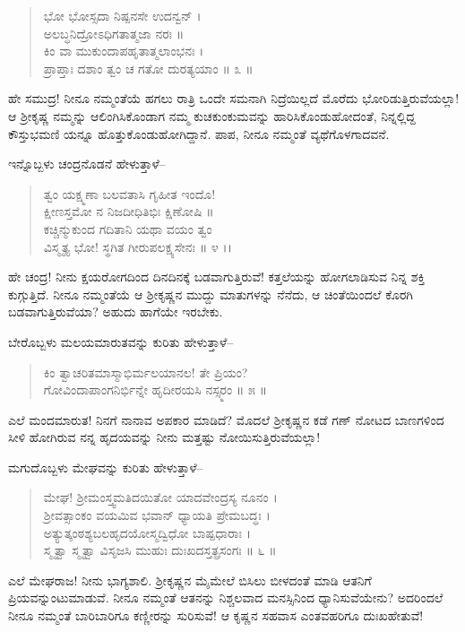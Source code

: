 \begin{verse}
ಭೋ ಭೋಸ್ಸದಾ ನಿಷ್ಪನಸೇ ಉದನ್ವನ್ ।\\ಅಲಬ್ಧನಿದ್ರೋಽಧಿಗತಾತ್ಮಜಾ ನರಃ ॥\\ಕಿಂ ವಾ ಮುಕುಂದಾಪಹೃತಾತ್ಮಲಾಂಭನಃ ।\\ಪ್ರಾಪ್ತಾಃ ದಶಾಂ ತ್ವಂ ಚ ಗತೋ ದುರತ್ಯಯಾಂ \num{॥ ೩ ॥}
\end{verse}

ಹೇ ಸಮುದ್ರ! ನೀನೂ ನಮ್ಮಂತೆಯೆ ಹಗಲು ರಾತ್ರಿ ಒಂದೇ ಸಮನಾಗಿ ನಿದ್ರೆಯಿಲ್ಲದೆ ಮೊರೆದು ಭೋರಿಡುತ್ತಿರುವೆಯಲ್ಲಾ! ಆ ಶ್ರೀಕೃಷ್ಣ ನಮ್ಮನ್ನು ಆಲಿಂಗಿಸಿಕೊಂಡಾಗ ನಮ್ಮ ಕುಚಕುಂಕುಮವನ್ನು ಹಾರಿಸಿಕೊಂಡುಹೋದಂತೆ, ನಿನ್ನಲ್ಲಿದ್ದ ಕೌಸ್ತುಭಮಣಿ ಯನ್ನೂ ಹೊತ್ತುಕೊಂಡುಹೋಗಿದ್ದಾನೆ. ಪಾಪ, ನೀನೂ ನಮ್ಮಂತೆ ವ್ಯಥೆಗೊಳಗಾದವನೆ.

ಇನ್ನೊಬ್ಬಳು ಚಂದ್ರನೊಡನೆ ಹೇಳುತ್ತಾಳೆ–

\begin{verse}
ತ್ವಂ ಯಕ್ಷ್ಮಣಾ ಬಲವತಾಸಿ ಗೃಹೀತ ಇಂದೊ!\\ಕ್ಷೀಣಸ್ತಮೋ ನ ನಿಜದೀಧಿತಿಭಿಃ ಕ್ಷಿಣೋಷಿ ॥\\ಕಚ್ಚಿನ್ಮುಕುಂದ ಗದಿತಾನಿ ಯಥಾ ವಯಂ ತ್ವಂ \\ವಿಸ್ಮೃತ್ಯ ಭೋ! ಸ್ಥಗಿತ ಗೀರುಪಲಕ್ಷ್ಯಸೇನಃ \num{॥ ೪ ।।}
\end{verse}

ಹೇ ಚಂದ್ರ! ನೀನು ಕ್ಷಯರೋಗದಿಂದ ದಿನದಿನಕ್ಕೆ ಬಡವಾಗುತ್ತಿರುವೆ! ಕತ್ತಲೆಯನ್ನು ಹೋಗಲಾಡಿಸುವ ನಿನ್ನ ಶಕ್ತಿ ಕುಗ್ಗುತ್ತಿದೆ. ನೀನೂ ನಮ್ಮಂತೆಯೆ ಆ ಶ್ರೀಕೃಷ್ಣನ ಮುದ್ದು ಮಾತುಗಳನ್ನು ನೆನೆದು, ಆ ಚಿಂತೆಯಿಂದಲೆ ಕೊರಗಿ ಬಡವಾಗುತ್ತಿರುವೆಯಾ? ಅಹುದು ಹಾಗೆಯೇ ಇರಬೇಕು.

ಬೇರೊಬ್ಬಳು ಮಲಯಮಾರುತವನ್ನು ಕುರಿತು ಹೇಳುತ್ತಾಳೆ–

\begin{verse}
ಕಿಂ ತ್ವಾಚರಿತಮಾಸ್ಮಾಭಿರ್ಮಲಯಾನಲ! ತೇ ಪ್ರಿಯಂ?\\ಗೋವಿಂದಾಪಾಂಗನಿರ್ಭಿನ್ನೇ ಹೃದೀರಯಸಿ ನಸ್ಸ್ಮರಂ \num{॥ ೫ ॥}
\end{verse}

ಎಲೆ ಮಂದಮಾರುತ! ನಿನಗೆ ನಾನಾವ ಅಪಕಾರ ಮಾಡಿದೆ? ಮೊದಲೆ ಶ್ರೀಕೃಷ್ಣನ ಕಡೆ ಗಣ್ ನೋಟದ ಬಾಣಗಳಿಂದ ಸೀಳಿ ಹೋಗಿರುವ ನನ್ನ ಹೃದಯವನ್ನು ನೀನು ಮತ್ತಷ್ಟು ನೋಯಿಸುತ್ತಿರುವೆಯಲ್ಲಾ!

ಮಗುದೊಬ್ಬಳು ಮೇಘವನ್ನು ಕುರಿತು ಹೇಳುತ್ತಾಳೆ–

\begin{verse}
ಮೇಘ! ಶ್ರೀಮಂಸ್ತ್ವಮತಿದಯಿತೋ ಯಾದವೇಂದ್ರಸ್ಯ ನೂನಂ ।\\ಶ್ರೀವತ್ಸಾಂಕಂ ವಯಮಿವ ಭವಾನ್ ಧ್ಯಾಯತಿ ಪ್ರೇಮಬದ್ಧಃ ।\\ಅತ್ಯುತ್ಕಂಠಶ್ಯಬಲಹೃದಯೋಸ್ಮದ್ವಿಧೋ ಬಾಷ್ಪಧಾರಾಃ ।\\ಸ್ಮೃತ್ವಾ ಸ್ಮೃತ್ವಾ ವಿಸೃಜಸಿ ಮುಹುಃ ದುಃಖದಸ್ತತ್ಪ್ರಸಂಗಃ \num{॥ ೬ ॥}
\end{verse}

ಎಲೆ ಮೇಘರಾಜ! ನೀನು ಭಾಗ್ಯಶಾಲಿ. ಶ್ರೀಕೃಷ್ಣನ ಮೈಮೇಲೆ ಬಿಸಿಲು ಬೀಳದಂತೆ ಮಾಡಿ ಆತನಿಗೆ ಪ್ರಿಯವನ್ನುಂಟುಮಾಡುವೆ. ನೀನೂ ನಮ್ಮಂತೆ ಆತನನ್ನು ನಿಶ್ಚಲವಾದ ಮನಸ್ಸಿನಿಂದ ಧ್ಯಾನಿಸುವೆಯೇನು? ಅದರಿಂದಲೆ ನೀನೂ ನಮ್ಮಂತೆ ಬಾರಿಬಾರಿಗೂ ಕಣ್ಣೀರನ್ನು ಸುರಿಸುವೆ! ಆ ಕೃಷ್ಣನ ಸಹವಾಸ ಎಂತವಹರಿಗೂ ದುಃಖಹೇತುವೆ!

